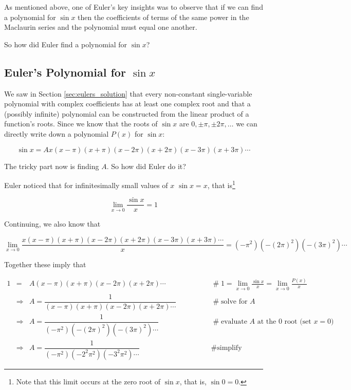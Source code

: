 \documentclass[11pt, oneside]{article}   	%
\begin{document}
\bigskip
\noindent
As mentioned above, one of Euler's key insights was to observe
that if we can find a polynomial for $\sin x$ then the
coefficients of terms of the same power in the Maclaurin series
and the polynomial must equal one another.

\bigskip
\noindent
So how did Euler find a polynomial for $\sin x$?

\subsection{Euler's Polynomial for $\sin x$}
We saw in Section \ref{sec:eulers_solution} that every
non-constant single-variable polynomial with complex coefficients
has at least one complex root and that a (possibly infinite)
polynomial can be constructed from the linear product of a
function's roots. Since we know that the roots of $\sin x$ are
$0, \pm \pi, \pm 2\pi, \hdots$ we can directly write down a
polynomial $P(x)$ for $\sin x$:

\begin{equation*}
\sin x =  A x (x - \pi)(x + \pi) (x - 2\pi)(x + 2\pi) (x - 3\pi) (x + 3\pi) \cdots
\end{equation*}

\bigskip
\noindent
The tricky part now is finding $A$. So how did Euler do it? 

\bigskip
\noindent
Euler noticed that for infinitesimally small values of $x$
$\sin x = x$, that is\footnote{Note that this limit occurs at
the zero root of $\sin x$, that is, $\sin 0 = 0$.}

\bigskip
\begin{equation*}
\lim_{x \to 0} \frac{\sin x}{x} = 1
\end{equation*}

\bigskip
\noindent
Continuing, we also know that

\begin{equation*}
\lim_{x \to 0} \dfrac{x (x - \pi)(x+\pi)(x - 2\pi)(x + 2\pi)(x - 3\pi)(x + 3\pi) \cdots}{x} = (-\pi^2)(-(2\pi)^2)(-(3\pi)^2) \cdots
\end{equation*}

\bigskip
\noindent
Together these imply that

\begin{equation*}
\begin{array}{lllll}
1 
&=&  A (x - \pi)(x + \pi) (x - 2\pi)(x+2\pi) \cdots
                &\qquad \qquad \mathrel{\#} {\displaystyle 1 =  \lim_{x \to 0} \frac{\sin x}{x} = \lim_{x \to 0}  \frac{P(x)}{x}} \\
[22pt]
&\Rightarrow& A = \dfrac{1}{(x - \pi)(x + \pi) (x - 2\pi)(x+2\pi)
\cdots }
                &\qquad \qquad \mathrel{\#} \text{solve for $A$} \\
[22pt]
&\Rightarrow& A = \dfrac{1}{(-\pi^2)(-(2\pi)^2) (-(3\pi)^2) \cdots } 
                &\qquad \qquad \mathrel{\#} \text{evaluate $A$ at the 0 root (set $x = 0)$} \\
[22pt]
&\Rightarrow& A = \dfrac{1}{(-\pi^2) (- 2^2 \pi^2) (-3^2 \pi^2) \cdots}
                &\qquad \qquad \mathrel{\#} \text{simplify}  
\end{array}
\end{equation*}
\end{document}
